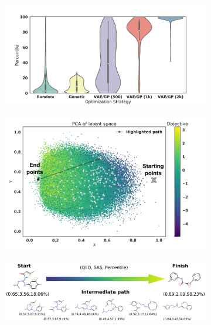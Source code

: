 \begin{figure}
    \centering
	\begin{subfigure}{0.45\textwidth}
      \caption{}
       \includegraphics[width=\textwidth]{fig4a_compare_violin.png}
    \end{subfigure}
    \vspace{1em}
	\begin{subfigure}{0.45\textwidth}
      \caption{}
       \includegraphics[width=\textwidth]{fig4b_2k_opt.png}
    \end{subfigure}
	\begin{subfigure}{\textwidth}
      \caption{}
	    \includegraphics[width=\textwidth]{fig4c_interpolation_2.png}

\end{subfigure}
\end{figure}
